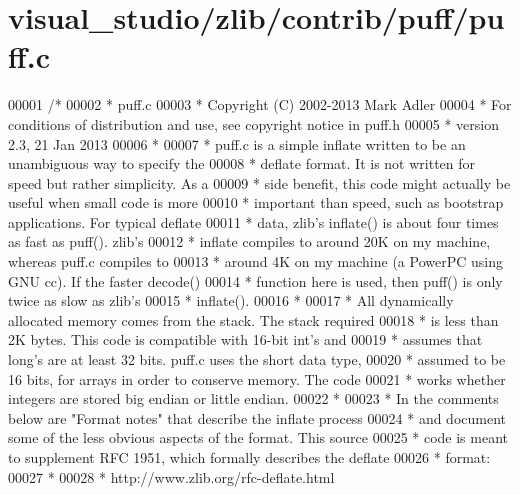 \hypertarget{visual__studio_2zlib_2contrib_2puff_2puff_8c_source}{}\section{visual\+\_\+studio/zlib/contrib/puff/puff.c}
\label{visual__studio_2zlib_2contrib_2puff_2puff_8c_source}

\begin{DoxyCode}
00001 \textcolor{comment}{/*}
00002 \textcolor{comment}{ * puff.c}
00003 \textcolor{comment}{ * Copyright (C) 2002-2013 Mark Adler}
00004 \textcolor{comment}{ * For conditions of distribution and use, see copyright notice in puff.h}
00005 \textcolor{comment}{ * version 2.3, 21 Jan 2013}
00006 \textcolor{comment}{ *}
00007 \textcolor{comment}{ * puff.c is a simple inflate written to be an unambiguous way to specify the}
00008 \textcolor{comment}{ * deflate format.  It is not written for speed but rather simplicity.  As a}
00009 \textcolor{comment}{ * side benefit, this code might actually be useful when small code is more}
00010 \textcolor{comment}{ * important than speed, such as bootstrap applications.  For typical deflate}
00011 \textcolor{comment}{ * data, zlib's inflate() is about four times as fast as puff().  zlib's}
00012 \textcolor{comment}{ * inflate compiles to around 20K on my machine, whereas puff.c compiles to}
00013 \textcolor{comment}{ * around 4K on my machine (a PowerPC using GNU cc).  If the faster decode()}
00014 \textcolor{comment}{ * function here is used, then puff() is only twice as slow as zlib's}
00015 \textcolor{comment}{ * inflate().}
00016 \textcolor{comment}{ *}
00017 \textcolor{comment}{ * All dynamically allocated memory comes from the stack.  The stack required}
00018 \textcolor{comment}{ * is less than 2K bytes.  This code is compatible with 16-bit int's and}
00019 \textcolor{comment}{ * assumes that long's are at least 32 bits.  puff.c uses the short data type,}
00020 \textcolor{comment}{ * assumed to be 16 bits, for arrays in order to conserve memory.  The code}
00021 \textcolor{comment}{ * works whether integers are stored big endian or little endian.}
00022 \textcolor{comment}{ *}
00023 \textcolor{comment}{ * In the comments below are "Format notes" that describe the inflate process}
00024 \textcolor{comment}{ * and document some of the less obvious aspects of the format.  This source}
00025 \textcolor{comment}{ * code is meant to supplement RFC 1951, which formally describes the deflate}
00026 \textcolor{comment}{ * format:}
00027 \textcolor{comment}{ *}
00028 \textcolor{comment}{ *    http://www.zlib.org/rfc-deflate.html}

\end{DoxyCode}
